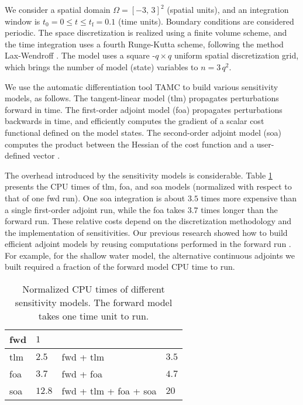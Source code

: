 \documentclass[final,sort&compress]{elsarticle}
\begin{document}
We consider a spatial domain $\Omega = [-3,\,3]^2$ (spatial units), 
and an integration window is $t_0 = 0 \le t \le t_\textrm{f} = 0.1$ (time units). 
Boundary conditions are considered periodic. The space discretization is realized using a finite volume scheme, 
and the time integration uses a fourth Runge-Kutta scheme, following the method Lax-Wendroff \cite{Wendroff_1998}.
The model uses a square -$q \times q$ uniform spatial discretization grid, which brings the number of model (state) variables to $n = 3\,q^2$.

We use the automatic differentiation tool TAMC \cite{giering1997tangent,TAMC_1998} 
to build various sensitivity models, as follows. 
The tangent-linear model ({\sc tlm}) propagates perturbations forward in time. 
The first-order adjoint model ({\sc foa}) propagates perturbations backwards in time, 
and efficiently computes the gradient of a scalar cost functional defined on the model states. 
The second-order adjoint model ({\sc soa}) computes the product between the Hessian of the cost function 
and a user-defined vector \cite{Cioaca_2011}. 

The overhead introduced by the sensitivity models is considerable.
Table \ref{Table:CPUTimes_exp} presents the CPU times of {\sc tlm}, {\sc foa}, and {\sc soa} models 
(normalized with respect to that of one {\sc fwd} run). 
One {\sc soa} integration is about $3.5$ times more expensive than a single first-order adjoint run, 
while the {\sc foa} takes $3.7$ times longer than the forward run. 
These relative costs depend on the discretization methodology and the implementation of sensitivities. 
Our previous research showed how to build efficient adjoint models by reusing computations performed
in the forward run \cite{Cioaca_2011}. For example, for the shallow water model, the alternative continuous adjoints we built required
a fraction of the forward model CPU time to run. 


\begin{table}
\caption{Normalized CPU times of different sensitivity models. The forward model takes one time unit to run.}
\centering
\begin{tabular}{ll|ll}
\hline
  {\sc fwd} & $1$ & & \\ \hline
  {\sc tlm} & $2.5$ & {\sc fwd} + {\sc tlm} & $3.5$ \\ \hline
  {\sc foa} & $3.7$ & {\sc fwd} + {\sc foa} & $4.7$\\ \hline
  {\sc soa} & $12.8$ & {\sc fwd} + {\sc tlm} + {\sc foa} + {\sc soa} & $20$ \\ \hline
\end{tabular}
\label{Table:CPUTimes_exp}
\end{table}
\end{document}

